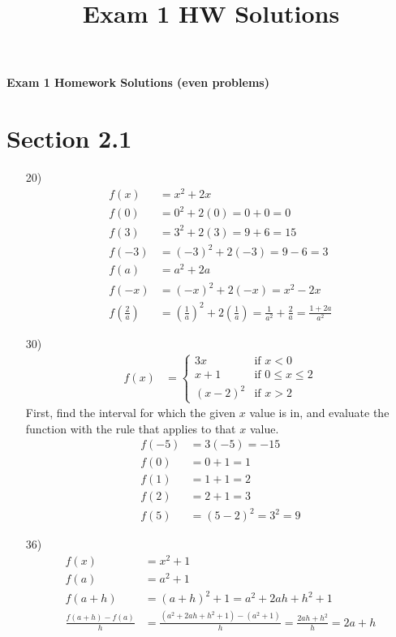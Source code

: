 \documentclass[fleqn]{article}
\title{Exam 1 HW Solutions}
\begin{document}
{\Large\textbf{Exam 1 Homework Solutions (even problems)}}

\section{Section 2.1}

\begin{enumerate}
\item[20)] 
\begin{align*}
f(x) &= x^2 + 2x \\
f(0) &= 0^2 + 2(0) = 0 + 0 = 0 \\
f(3) &= 3^2 + 2(3) = 9 + 6 = 15 \\
f(-3) &= (-3)^2 + 2(-3) = 9 - 6 = 3 \\
f(a) &= a^2 + 2a \\
f(-x) &= (-x)^2 + 2(-x) = x^2 - 2x \\
f\left(\frac{2}{a}\right) &= \left(\frac{1}{a}\right)^2 + 2\left(\frac{1}{a}\right) = \frac{1}{a^2} + \frac{2}{a} = \frac{1 + 2a}{a^2}
\end{align*}

\item[30)]
\begin{align*}
f(x) &= \begin{cases}
3x & \text{if } x < 0 \\
x + 1 & \text{if } 0 \leq x \leq 2 \\
(x - 2)^2 & \text{if } x > 2
\end{cases}
\end{align*}
First, find the interval for which the given $x$ value is in, and evaluate the function with the rule that applies to that $x$ value.
\begin{align*}
f(-5) &= 3(-5) = -15 \\
f(0) &= 0 + 1 = 1 \\
f(1) &= 1 + 1 = 2 \\
f(2) &= 2 + 1 = 3 \\
f(5) &= (5 - 2)^2 = 3^2 = 9
\end{align*}

\item[36)] 
\begin{align*}
f(x) &= x^2 + 1 \\
f(a) &= a^2 + 1 \\
f(a+h) &= (a + h)^2 + 1 = a^2 + 2ah + h^2 + 1 \\
\frac{f(a+h) - f(a)}{h} &= \frac{(a^2 + 2ah + h^2 + 1) - (a^2 + 1)}{h} 
= \frac{2ah + h^2}{h}
= 2a + h
\end{align*}


\end{enumerate}
\end{document}
